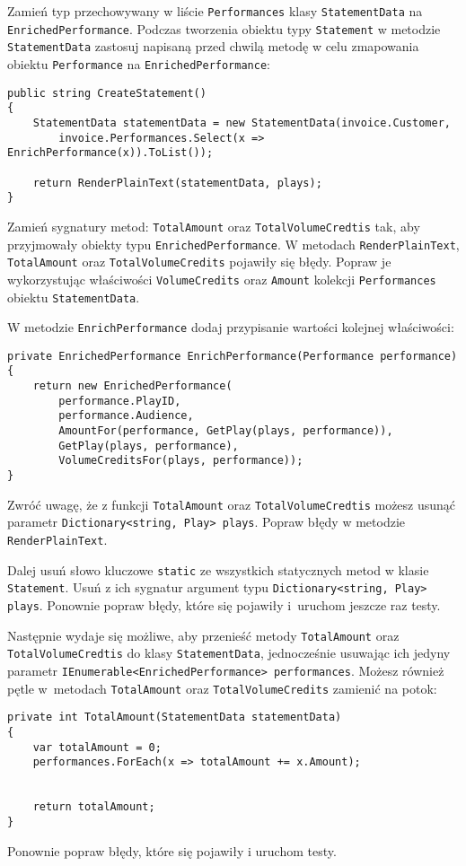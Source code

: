 Zamień typ przechowywany w liście \texttt{Performances} klasy \texttt{StatementData} na \texttt{EnrichedPerformance}. Podczas tworzenia obiektu typy \texttt{Statement} w metodzie \texttt{StatementData} zastosuj napisaną przed chwilą metodę w celu zmapowania obiektu \texttt{Performance} na \texttt{EnrichedPerformance}:
\begin{lstlisting}
public string CreateStatement()
{
	StatementData statementData = new StatementData(invoice.Customer, 
		invoice.Performances.Select(x => EnrichPerformance(x)).ToList());
	
	return RenderPlainText(statementData, plays);
}
\end{lstlisting}
Zamień sygnatury metod: \texttt{TotalAmount} oraz \texttt{TotalVolumeCredtis} tak, aby przyjmowały obiekty typu \texttt{EnrichedPerformance}. W metodach \texttt{RenderPlainText}, \texttt{TotalAmount} oraz \texttt{TotalVolumeCredits} pojawiły się błędy. Popraw je wykorzystując właściwości \texttt{VolumeCredits} oraz \texttt{Amount} kolekcji \texttt{Performances} obiektu \texttt{StatementData}.




W metodzie \texttt{EnrichPerformance} dodaj przypisanie wartości kolejnej właściwości:
\begin{lstlisting}
private EnrichedPerformance EnrichPerformance(Performance performance)
{
	return new EnrichedPerformance(
		performance.PlayID,
		performance.Audience,
		AmountFor(performance, GetPlay(plays, performance)),
		GetPlay(plays, performance),
		VolumeCreditsFor(plays, performance));
}
\end{lstlisting}
Zwróć uwagę, że z funkcji \texttt{TotalAmount} oraz \texttt{TotalVolumeCredtis} możesz usunąć parametr \texttt{Dictionary<string, Play> plays}. Popraw błędy w metodzie \texttt{RenderPlainText}. 


Dalej usuń słowo kluczowe \texttt{static} ze wszystkich statycznych metod w klasie \texttt{Statement}. Usuń z ich sygnatur argument typu \texttt{Dictionary<string, Play> plays}. Ponownie popraw błędy, które się pojawiły i~uruchom jeszcze raz testy.


Następnie wydaje się możliwe, aby przenieść metody \texttt{TotalAmount} oraz \texttt{TotalVolumeCredtis} do klasy \texttt{StatementData}, jednocześnie usuwając ich jedyny parametr \texttt{IEnumerable<EnrichedPerformance> performances}. Możesz również pętle w~metodach \texttt{TotalAmount} oraz \texttt{TotalVolumeCredits} zamienić na potok:
\begin{lstlisting}
private int TotalAmount(StatementData statementData)
{
	var totalAmount = 0;
    performances.ForEach(x => totalAmount += x.Amount);

	
	return totalAmount;
}
\end{lstlisting}
Ponownie popraw błędy, które się pojawiły i uruchom testy.


